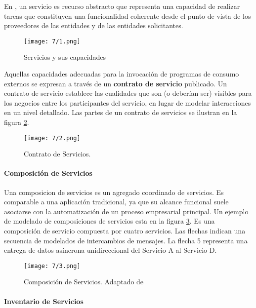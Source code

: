   En  , un servicio es recurso abstracto que representa una capacidad de realizar tareas que constituyen una funcionalidad coherente desde el punto de vista de los proveedores de las entidades y de las entidades solicitantes.  

  
   			 
 	\begin{figure}%
 	\texttt{[image: 7/1.png]}
 	\caption{Servicios y sus capacidades}
 	\label{fig:servicio}
 \end{figure}
 
 Aquellas capacidades adecuadas para la invocación de programas de consumo externos se expresan a través de un \textbf{contrato de servicio} publicado. Un contrato de servicio establece las cualidades que son (o deberían ser) visibles para los negocios entre los participantes del servicio, en lugar de   modelar interacciones en un  nivel detallado. Las partes de un contrato de servicios se ilustran en la figura \ref{fig:contrato}. 
 
 \begin{figure}%
 		\texttt{[image: 7/2.png]} 
 		\caption{Contrato de Servicios.}  
 		\label{fig:contrato}  
 \end{figure}
 
 \paragraph{Composición de Servicios}
 
  Una \gls{composicion de servicios} es un agregado coordinado de servicios. Es comparable a una aplicación tradicional, ya que su alcance funcional suele asociarse con la automatización de un proceso empresarial principal.  
  Un ejemplo de modelado de composiciones de servicios esta en la figura \ref{fig:composicion}. Es una composición de servicio compuesta por cuatro servicios. Las flechas indican una secuencia de modelados de  intercambios de  mensajes. La flecha 5 representa una entrega de datos asíncrona unidireccional del Servicio A al Servicio D.
  
  	\begin{figure}%
  	\texttt{[image: 7/3.png]}
  	\caption{Composición de Servicios. Adaptado de \ER}
  	\label{fig:composicion}
  \end{figure}
  
  
  \paragraph{Inventario de Servicios}
  

